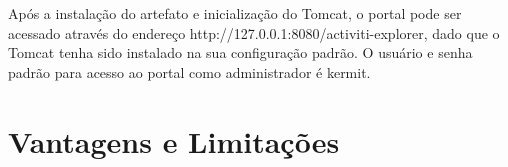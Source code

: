 Após a instalação do artefato e inicialização do Tomcat, o portal pode ser acessado através do endereço http://127.0.0.1:8080/activiti-explorer, dado que o Tomcat tenha sido instalado na sua configuração padrão. O usuário e senha padrão para acesso ao portal como administrador é kermit.



\section{Vantagens e Limitações}\label{sec:activiti-vantages_limitacoes}


